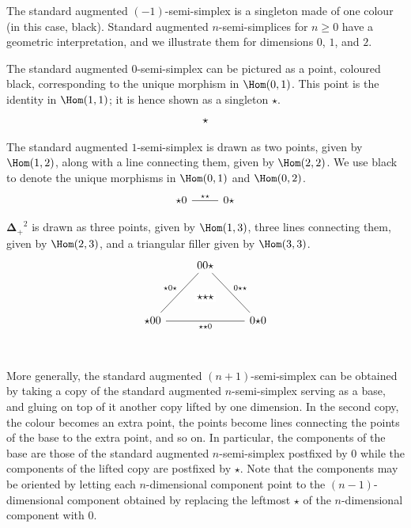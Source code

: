\documentclass{art.cls/art}
\newcommand{\DeltaPlus}{\ensuremath{\boldsymbol{\Delta}_+}}
\newcommand{\kstar}{{\star}}
\begin{document}
The standard augmented $(-1)$-semi-simplex is a singleton made of one colour (in this case, black). Standard augmented $n$-semi-simplices for $n \geq 0$ have a geometric interpretation, and we illustrate them for dimensions $0$, $1$, and $2$.

\begin{example}[$\DeltaPlus^0$]
  The standard augmented $0$-semi-simplex can be pictured as a point, coloured black, corresponding to the unique morphism in $\Hom(0, 1)$. This point is the identity in $\Hom(1, 1)$; it is hence shown as a singleton $\kstar$.
  \begin{equation*}
    \begin{tikzcd}
      \kstar
    \end{tikzcd}
  \end{equation*}
\end{example}

\begin{example}[$\DeltaPlus^1$]
  The standard augmented $1$-semi-simplex is drawn as two points, given by $\Hom(1, 2)$, along with a line connecting them, given by $\Hom(2, 2)$. We use black to denote the unique morphisms in $\Hom(0, 1)$ and $\Hom(0, 2)$.
  \begin{equation*}
    \begin{tikzcd}
      \kstar0 \arrow[r, dash, "\kstar\kstar"] & 0\kstar
    \end{tikzcd}
  \end{equation*}
\end{example}

\begin{example}[$\DeltaPlus^2$]
  $\DeltaPlus^2$ is drawn as three points, given by $\Hom(1, 3)$, three lines connecting them, given by $\Hom(2, 3)$, and a triangular filler given by $\Hom(3, 3)$.
  \begin{equation*}
    \begin{tikzcd}
      & |[alias=F]|00\kstar \arrow[ddr, dash, "0\kstar\kstar"] & \\\\
      \kstar00 \arrow[rr, dash, "\kstar\kstar0"{name=T, below}]\arrow[uur, dash, "\kstar0\kstar"] && 0\kstar0 \\
      \arrow[rightarrow, from=F, to=T, phantom, "\kstar\kstar\kstar" description]
    \end{tikzcd}
  \end{equation*}
\end{example}

More generally, the standard augmented $(n + 1)$-semi-simplex can be obtained by taking a copy of the standard augmented $n$-semi-simplex serving as a base, and gluing on top of it another copy lifted by one dimension. In the second copy, the colour becomes an extra point, the points become lines connecting the points of the base to the extra point, and so on. In particular, the components of the base are those of the standard augmented $n$-semi-simplex postfixed by $0$ while the components of the lifted copy are postfixed by $\kstar$. Note that the components may be oriented by letting each $n$-dimensional component point to the $(n-1)$-dimensional component obtained by replacing the leftmost $\kstar$ of the $n$-dimensional component with $0$.
\end{document}
